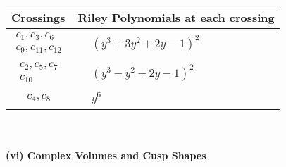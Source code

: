 \documentclass[1p]{elsarticle_modified}
\theoremstyle{definition}
\begin{document}
\begin{tabular}{m{50pt}|m{274pt}}
Crossings & \hspace{64pt}Riley Polynomials at each crossing \\
\hline $$\begin{aligned}c_{1},c_{3},c_{6}\\c_{9},c_{11},c_{12}\end{aligned}$$&$\begin{aligned}
&(y^3+3 y^2+2 y-1)^2
\end{aligned}$\\
\hline $$\begin{aligned}c_{2},c_{5},c_{7}\\c_{10}\end{aligned}$$&$\begin{aligned}
&(y^3- y^2+2 y-1)^2
\end{aligned}$\\
\hline $$\begin{aligned}c_{4},c_{8}\end{aligned}$$&$\begin{aligned}
&y^6
\end{aligned}$\\
\hline
\end{tabular}\\~\\
\newpage\flushleft \textbf{(vi) Complex Volumes and Cusp Shapes}
\end{document}
